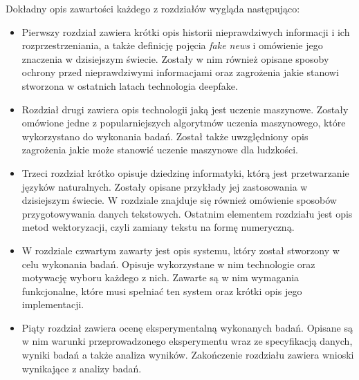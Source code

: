 Dokładny opis zawartości każdego z rozdziałów wygląda następująco:
\begin{itemize}
    \item Pierwszy rozdział zawiera krótki opis historii nieprawdziwych informacji
    i ich rozprzestrzeniania, a także definicję pojęcia \textit{fake news} i omówienie jego znaczenia 
    w dzisiejszym świecie. Zostały w nim również opisane sposoby ochrony przed nieprawdziwymi informacjami
    oraz zagrożenia jakie stanowi stworzona w ostatnich latach technologia deepfake.
    \item Rozdział drugi zawiera opis technologii jaką jest uczenie maszynowe. Zostały
    omówione jedne z popularniejszych algorytmów uczenia maszynowego, które wykorzystano
    do wykonania badań. Został także uwzględniony opis zagrożenia jakie może stanowić uczenie
    maszynowe dla ludzkości.
    \item Trzeci rozdział krótko opisuje dziedzinę informatyki, którą jest przetwarzanie 
    języków naturalnych. Zostały opisane przykłady jej zastosowania w dzisiejszym świecie.
    W rozdziale znajduje się również omówienie sposobów przygotowywania danych tekstowych. Ostatnim elementem
    rozdziału jest opis metod wektoryzacji, czyli zamiany tekstu na formę numeryczną. 
    \item W rozdziale czwartym zawarty jest opis systemu, który został 
    stworzony w celu wykonania badań. Opisuje wykorzystane w nim technologie oraz motywację 
    wyboru każdego z nich. Zawarte są w nim wymagania funkcjonalne, które musi spełniać ten system oraz
    krótki opis jego implementacji.
    \item Piąty rozdział zawiera ocenę eksperymentalną wykonanych badań. Opisane są w nim 
    warunki przeprowadzonego eksperymentu wraz ze specyfikacją danych, wyniki badań a także 
    analiza wyników. Zakończenie rozdziału zawiera wnioski wynikające z analizy badań.  
\end{itemize}